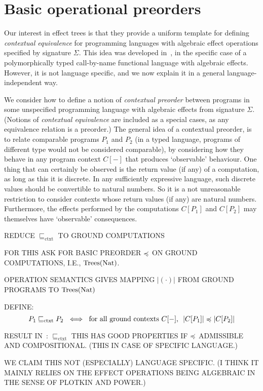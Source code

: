 \section{Basic operational preorders}

Our interest in effect trees is that they provide a 
uniform template for defining 
 \emph{contextual equivalence} for programming languages with algebraic effect operations
specified by signature $\Sigma$. This idea was developed in~\cite{gom}, in the specific case of a polymorphically typed call-by-name functional language with algebraic effects. However, it is not language specific, and we now explain it in a general language-independent way.

We consider how to define a notion of \emph{contextual preorder} between programs in some unspecified programming language with algebraic effects from signature $\Sigma$. (Notions of \emph{contextual equivalence}
are included as a special cases, as any equivalence relation is a preorder.) The general idea of a contextual preorder, is to relate comparable programs $P_1$ and $P_2$ (in a typed language, programs of different type would not be considered comparable), by considering how they behave in any program context $C[-]$ that produces `observable' behaviour. One thing that can certainly be observed is the return value (if any) of a computation, as long as this it is discrete. In any sufficiently expressive language, such discrete values should be convertible to natural numbers. So it is a not unreasonable  restriction to consider contexts whose return values (if any) are natural numbers. Furthermore, the effects performed by the computations $C[P_1]$ and $C[P_2]$ may themselves have `observable' consequences. 

REDUCE $\sqsubseteq_\text{ctxt}$ TO GROUND COMPUTATIONS

FOR THIS ASK FOR BASIC PREORDER $\preccurlyeq$  ON GROUND COMPUTATIONS, I.E., $\textnormal{Trees}(\textnormal{Nat})$.

OPERATION SEMANTICS GIVES  MAPPING $|(\cdot)|$ FROM  GROUND PROGRAMS TO $\textnormal{Trees}(\textnormal{Nat})$

DEFINE:
\[ P_1 \sqsubseteq_\text{ctxt} P_2 ~ \iff ~
\text{for all ground contexts $C[-]$, $~ |C[P_1]| \preccurlyeq |C[P_2]|$}\]

RESULT IN~\cite{gom}:  $\sqsubseteq_\text{ctxt}$ THIS HAS GOOD PROPERTIES IF $\preccurlyeq$ ADMISSIBLE AND COMPOSITIONAL. (THIS IN CASE OF SPECIFIC LANGUAGE.)

WE CLAIM THIS NOT (ESPECIALLY) LANGUAGE SPECIFIC. (I THINK IT MAINLY RELIES ON THE EFFECT OPERATIONS BEING ALGEBRAIC IN THE SENSE OF PLOTKIN AND POWER.)

